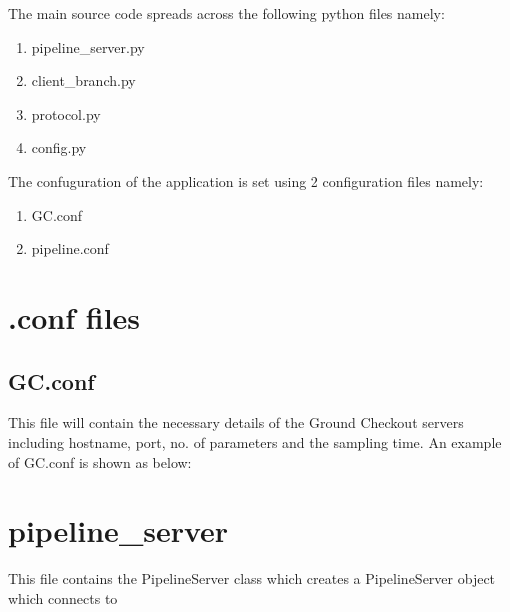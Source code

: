 The main source code spreads across the following python files namely:
\begin{enumerate}
	\item pipeline\_server.py
	\item client\_branch.py
	\item protocol.py
	\item config.py
\end{enumerate}
The confuguration of the application is set using 2 configuration files namely:
\begin{enumerate}
	\item GC.conf
	\item pipeline.conf
\end{enumerate}

\section{.conf files}
\subsection{GC.conf}
This file will contain the necessary details of the Ground Checkout servers
including hostname, port, no. of parameters and the sampling time. An example
of GC.conf is shown as below:


\section{pipeline\_server}
This file contains the PipelineServer class which creates a PipelineServer
object which connects to
